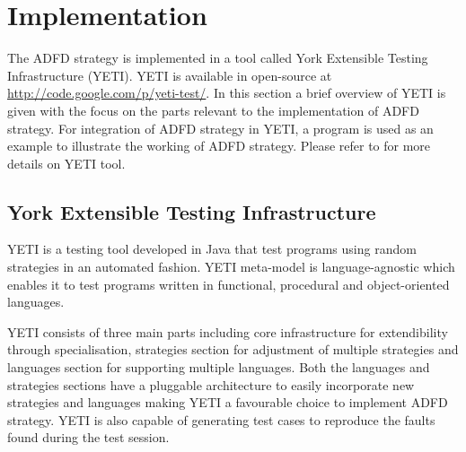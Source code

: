 


\section{Implementation}\label{sec:implementation}
The ADFD strategy is implemented in a tool called York Extensible Testing Infrastructure (YETI). YETI is available in open-source at \url{http://code.google.com/p/yeti-test/}. In this section a brief overview of YETI is given with the focus on the parts relevant to the implementation of ADFD strategy. For integration of ADFD strategy in YETI, a program is used as an example to illustrate the working of ADFD strategy. Please refer to  \cite{Oriol2011, Oriol2012, Oriol2010, Oriol2010b} for more details on YETI tool.

\subsection{York Extensible Testing Infrastructure}
YETI is a testing tool developed in Java that test programs using random strategies in an automated fashion. YETI meta-model is language-agnostic which enables it to test programs written in functional, procedural and object-oriented languages.

YETI consists of three main parts including core infrastructure for extendibility through specialisation, strategies section for adjustment of multiple strategies and languages section for supporting multiple languages. Both the languages and strategies sections have a pluggable architecture to easily incorporate new strategies and languages making YETI a favourable choice to implement ADFD strategy. YETI is also capable of generating test cases to reproduce the faults found during the test session.
 
